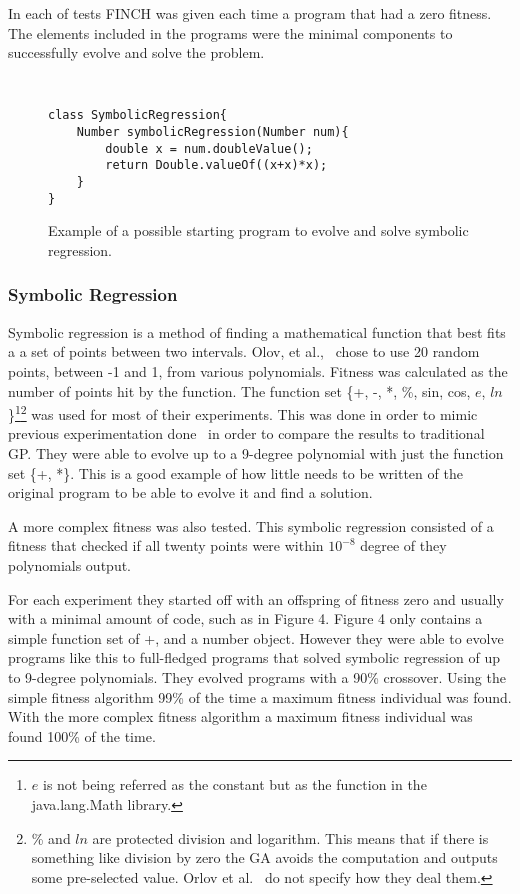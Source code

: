 \documentclass{sig-alternate}
\begin{document}
In each of tests FINCH was given each time a program that had a zero fitness. The elements included in the programs were the minimal components to successfully evolve and solve the problem.

\begin{figure}
\centering
{\tt
\begin{verbatim}
class SymbolicRegression{
    Number symbolicRegression(Number num){
        double x = num.doubleValue();
        return Double.valueOf((x+x)*x);
    }
}
\end{verbatim}
}
\caption{Example of a possible starting program to evolve and solve symbolic regression.}
\end{figure}
\subsubsection{Symbolic Regression}
Symbolic regression is a method of finding a mathematical function that best fits a a set of points between two intervals. Olov, et al.,~\cite{FINCH:2011} chose to use 20 random points, between -1 and 1, from various polynomials. Fitness was calculated as the number of points hit by the function. The function set \{+, -, *, \%, sin, cos, $e$, $ln$\}\footnote{$e$ is not being referred as the constant but as the function in the java.lang.Math library.}\footnote{\% and $ln$ are protected division and logarithm. This means that if there is something like division by zero the GA avoids the computation and outputs some pre-selected value. Orlov et al.~\cite{FINCH:2011} do not specify how they deal them.} was used for most of their experiments. This was done in order to mimic previous experimentation done~\cite{koza:1992} in order to compare the results to traditional GP. They were able to evolve up to a 9-degree polynomial with just the function set \{+, *\}. This is a good example of how little needs to be written of the original program to be able to evolve it and find a solution.

A more complex fitness was also tested. This symbolic regression consisted of a fitness that checked if all twenty points were within $10^{-8}$ degree of they polynomials output. 

For each experiment they started off with an offspring of fitness zero and usually with a minimal amount of code, such as in Figure 4. Figure 4 only contains a simple function set of {+, \*} and a number object. However they were able to evolve programs like this to full-fledged programs that solved symbolic regression of up to 9-degree polynomials. 
They evolved programs with a 90\% crossover. Using the simple fitness algorithm 99\% of the time a maximum fitness individual was found. With the more complex fitness algorithm a maximum fitness individual was found 100\% of the time.
\end{document}
